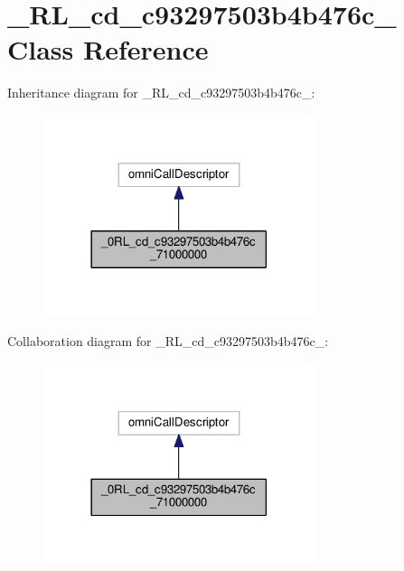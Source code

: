 \hypertarget{class__0_r_l__cd__c93297503b4b476c__71000000}{}\section{\+\_\+R\+L\+\_\+cd\+\_\+c93297503b4b476c\+\_ Class Reference}
\label{class__0_r_l__cd__c93297503b4b476c__71000000}


Inheritance diagram for \+\_\+R\+L\+\_\+cd\+\_\+c93297503b4b476c\+\_\+:
\nopagebreak
\begin{figure}[H]
\begin{center}
\leavevmode
\includegraphics[width=225pt]{class__0_r_l__cd__c93297503b4b476c__71000000__inherit__graph}
\end{center}
\end{figure}


Collaboration diagram for \+\_\+R\+L\+\_\+cd\+\_\+c93297503b4b476c\+\_\+:
\nopagebreak
\begin{figure}[H]
\begin{center}
\leavevmode
\includegraphics[width=225pt]{class__0_r_l__cd__c93297503b4b476c__71000000__coll__graph}
\end{center}
\end{figure}
